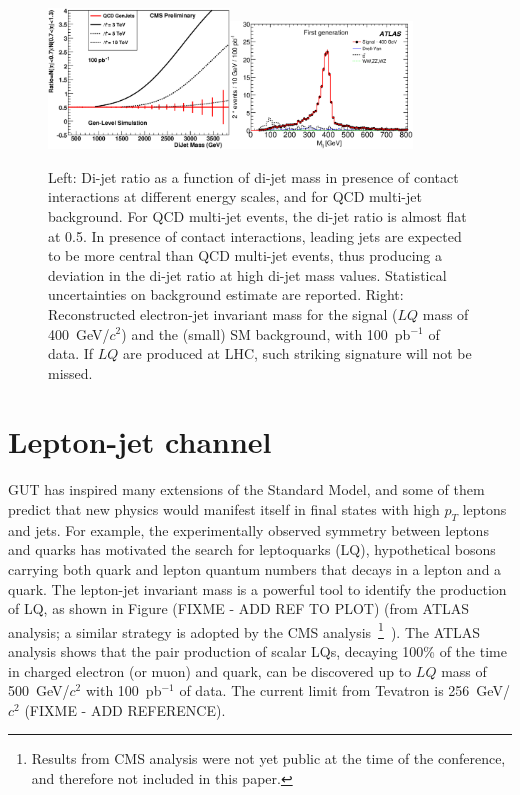 \documentclass{cimento}
\begin{document}
\begin{figure}[htbp] 
\centering
\includegraphics[width=0.43\textwidth]{DiJetRatio100pbOptFix.eps}\includegraphics[width=0.43\textwidth]{Mejfig5R.eps}  
\caption{Left: Di-jet ratio as a function of di-jet mass in presence of 
contact interactions at different energy scales, 
and for QCD multi-jet background. 
For QCD multi-jet events, the di-jet ratio is almost flat at 0.5. 
In presence of contact interactions, 
leading jets are expected to be more central than QCD multi-jet events, 
thus producing a deviation in the di-jet ratio at high di-jet mass values.
Statistical uncertainties on background estimate are reported.  
Right: Reconstructed electron-jet invariant mass for the signal 
($LQ$ mass of 400~GeV/$c^2$) and the (small) SM background, 
with 100~pb$^{-1}$ of data. If $LQ$ are produced at LHC, 
such striking signature will not be missed.}
\label{fig:DiJetRatioAndLQMej}
\end{figure}

\section{Lepton-jet channel} \label{leptonjet}
GUT has inspired many extensions of the Standard Model, and some 
of them predict that new physics would manifest itself in 
final states with high $p_T$ leptons and jets.
For example, the experimentally observed symmetry between 
leptons and quarks has motivated the search for leptoquarks (LQ), 
hypothetical bosons carrying both quark and lepton quantum numbers 
that decays in a lepton and a quark.
The lepton-jet invariant mass is a powerful tool to identify the production of LQ, 
as shown in Figure (FIXME - ADD REF TO PLOT) (from ATLAS analysis; 
a similar strategy is adopted by the CMS analysis~\footnote{Results from 
CMS analysis were not yet public at the time 
of the conference, and therefore not included in this paper.}~).
The ATLAS analysis shows that the pair production of scalar LQs,  
decaying 100\% of the time in charged electron (or muon) and quark, 
can be discovered up to $LQ$ mass of 500~GeV/$c^2$ with 100~pb$^{-1}$ of data.
The current limit from Tevatron is 256~GeV/$c^2$ (FIXME - ADD REFERENCE).
\end{document}
